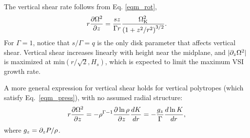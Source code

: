 The vertical shear rate follows from Eq. \ref{eqm_rot}, 
\begin{align}
  r\frac{\partial\Omega^2}{\partial z} = \frac{sz}{\Gamma r}  \frac{\Omega_{\rm K}^2}{
    \left(1+z^2/r^2\right)^{3/2}} . \label{vertical_shear_ex} 
\end{align}
For $\Gamma = 1$, notice that $s/\Gamma = q$ is the only disk parameter that affects vertical shear.
Vertical shear increases linearly with height near the midplane, and $|\partial_z \Omega^2|$ is maximized at
$\mathrm{min}(r/\sqrt{2},H_s)$, which is expected to limit the maximum VSI growth rate. 

A more general expression for vertical shear holds for vertical polytropes 
(which satisfy Eq.\ \ref{eqm_press}), with no assumed radial structure:
\begin{align}
  r\frac{\partial\Omega^2}{\partial z} = - \rho^{\Gamma-1}\frac{\partial\ln\rho}{\partial
    z}\frac{dK}{dr} = - \frac{g_z}{\Gamma}\frac{d\ln K}{dr}, \label{vertical_shear}
\end{align}
where $g_z = \partial_z P/\rho$.




